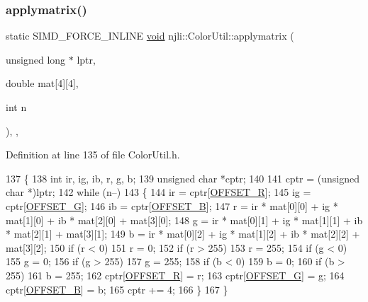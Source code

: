 \subsubsection{\texorpdfstring{applymatrix()}{applymatrix()}}
{\footnotesize\ttfamily static S\+I\+M\+D\+\_\+\+F\+O\+R\+C\+E\+\_\+\+I\+N\+L\+I\+NE \mbox{\hyperlink{_thread_8h_af1e856da2e658414cb2456cb6f7ebc66}{void}} njli\+::\+Color\+Util\+::applymatrix (\begin{DoxyParamCaption}\item[{unsigned long $\ast$}]{lptr,  }\item[{double}]{mat\mbox{[}4\mbox{]}\mbox{[}4\mbox{]},  }\item[{int}]{n }\end{DoxyParamCaption})\hspace{0.3cm}{\ttfamily [inline]}, {\ttfamily [static]}, {\ttfamily [protected]}}



Definition at line 135 of file Color\+Util.\+h.


\begin{DoxyCode}
137     \{
138       \textcolor{keywordtype}{int} ir, ig, ib, r, g, b;
139       \textcolor{keywordtype}{unsigned} \textcolor{keywordtype}{char} *cptr;
140 
141       cptr = (\textcolor{keywordtype}{unsigned} \textcolor{keywordtype}{char} *)lptr;
142       \textcolor{keywordflow}{while} (n--)
143         \{
144           ir = cptr[\mbox{\hyperlink{_color_util_8h_a0e82449b80c647bc55a73418ea52ec86}{OFFSET\_R}}];
145           ig = cptr[\mbox{\hyperlink{_color_util_8h_a7b64ecaea2b294f8f43f1872abee598f}{OFFSET\_G}}];
146           ib = cptr[\mbox{\hyperlink{_color_util_8h_a64f7c4af2b52d3d7076c2996f5980988}{OFFSET\_B}}];
147           r = ir * mat[0][0] + ig * mat[1][0] + ib * mat[2][0] + mat[3][0];
148           g = ir * mat[0][1] + ig * mat[1][1] + ib * mat[2][1] + mat[3][1];
149           b = ir * mat[0][2] + ig * mat[1][2] + ib * mat[2][2] + mat[3][2];
150           \textcolor{keywordflow}{if} (r < 0)
151             r = 0;
152           \textcolor{keywordflow}{if} (r > 255)
153             r = 255;
154           \textcolor{keywordflow}{if} (g < 0)
155             g = 0;
156           \textcolor{keywordflow}{if} (g > 255)
157             g = 255;
158           \textcolor{keywordflow}{if} (b < 0)
159             b = 0;
160           \textcolor{keywordflow}{if} (b > 255)
161             b = 255;
162           cptr[\mbox{\hyperlink{_color_util_8h_a0e82449b80c647bc55a73418ea52ec86}{OFFSET\_R}}] = r;
163           cptr[\mbox{\hyperlink{_color_util_8h_a7b64ecaea2b294f8f43f1872abee598f}{OFFSET\_G}}] = g;
164           cptr[\mbox{\hyperlink{_color_util_8h_a64f7c4af2b52d3d7076c2996f5980988}{OFFSET\_B}}] = b;
165           cptr += 4;
166         \}
167     \}
\end{DoxyCode}
\mbox{\label{classnjli_1_1_color_util_a0114e6d4fd8f02fb82ac5947030ab87d}} 

